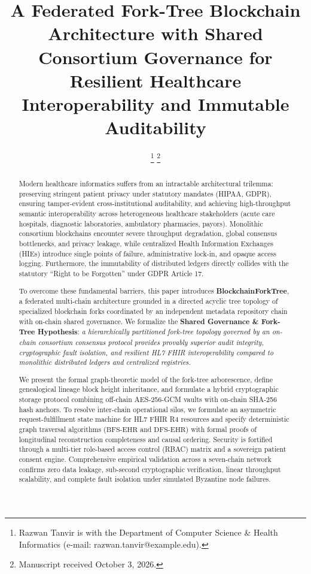 \documentclass[journal]{IEEEtran}
\theoremstyle{definition}
\begin{document}
\title{A Federated Fork-Tree Blockchain Architecture with Shared Consortium Governance for Resilient Healthcare Interoperability and Immutable Auditability}

\author{
    \thanks{Razwan Tanvir is with the Department of Computer Science \& Health Informatics (e-mail: razwan.tanvir@example.edu).}
    \thanks{Manuscript received October 3, 2026.}
}

\maketitle

\begin{abstract}
Modern healthcare informatics suffers from an intractable architectural trilemma: preserving stringent patient privacy under statutory mandates (HIPAA, GDPR), ensuring tamper-evident cross-institutional auditability, and achieving high-throughput semantic interoperability across heterogeneous healthcare stakeholders (acute care hospitals, diagnostic laboratories, ambulatory pharmacies, payors). Monolithic consortium blockchains encounter severe throughput degradation, global consensus bottlenecks, and privacy leakage, while centralized Health Information Exchanges (HIEs) introduce single points of failure, administrative lock-in, and opaque access logging. Furthermore, the immutability of distributed ledgers directly collides with the statutory ``Right to be Forgotten'' under GDPR Article 17. 

To overcome these fundamental barriers, this paper introduces \textbf{BlockchainForkTree}, a federated multi-chain architecture grounded in a directed acyclic tree topology of specialized blockchain forks coordinated by an independent metadata repository chain with on-chain shared governance. We formalize the \textbf{Shared Governance \& Fork-Tree Hypothesis}: \textit{a hierarchically partitioned fork-tree topology governed by an on-chain consortium consensus protocol provides provably superior audit integrity, cryptographic fault isolation, and resilient HL7 FHIR interoperability compared to monolithic distributed ledgers and centralized registries.} 

We present the formal graph-theoretic model of the fork-tree arborescence, define genealogical lineage block height inheritance, and formulate a hybrid cryptographic storage protocol combining off-chain AES-256-GCM vaults with on-chain SHA-256 hash anchors. To resolve inter-chain operational silos, we formulate an asymmetric request-fulfillment state machine for HL7 FHIR R4 resources and specify deterministic graph traversal algorithms ($\text{BFS-EHR}$ and $\text{DFS-EHR}$) with formal proofs of longitudinal reconstruction completeness and causal ordering. Security is fortified through a multi-tier role-based access control (RBAC) matrix and a sovereign patient consent engine. Comprehensive empirical validation across a seven-chain network confirms zero data leakage, sub-second cryptographic verification, linear throughput scalability, and complete fault isolation under simulated Byzantine node failures.
\end{abstract}
\end{document}
